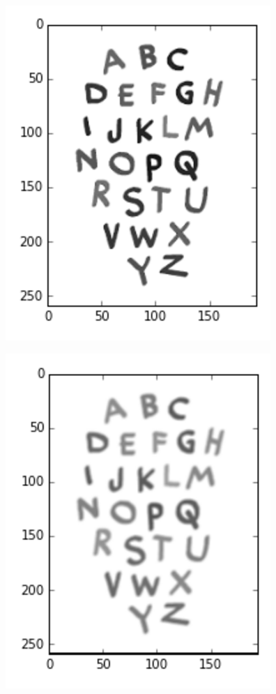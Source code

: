 \documentclass{article}
\begin{document}
			\begin{figure}[ht!]
				\begin{minipage}{.5\textwidth}
					\centering
					\includegraphics[width=.6\linewidth]{images/original_image.png}
					\label{fig:test1}
				\end{minipage}
				\begin{minipage}{.5\textwidth}
					\centering
					\includegraphics[width=.6\linewidth]{images/mean_filter_after.png}
					\label{fig:test2}
				\end{minipage}
			\end{figure}
\end{document}
